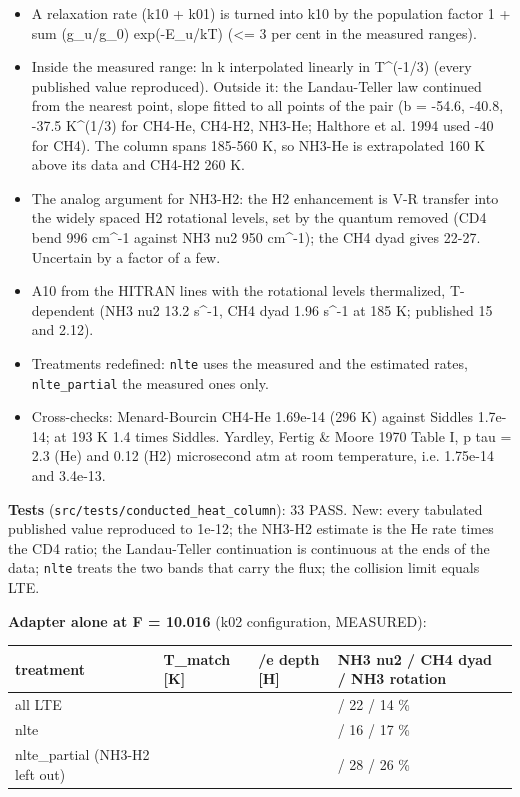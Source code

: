 \documentclass[english,a4paper]{my_memo}
\providecommand{\tightlist}{\setlength{\itemsep}{0pt}\setlength{\parskip}{0pt}}
\begin{document}
\begin{itemize}
\tightlist
\item
  A relaxation rate (k10 + k01) is turned into k10 by the population
  factor 1 + sum (g\_u/g\_0) exp(-E\_u/kT) (\textless= 3 per cent in the measured
  ranges).
\item
  Inside the measured range: ln k interpolated linearly in T\^{}(-1/3)
  (every published value reproduced). Outside it: the Landau-Teller law
  continued from the nearest point, slope fitted to all points of the pair
  (b = -54.6, -40.8, -37.5 K\^{}(1/3) for CH4-He, CH4-H2, NH3-He; Halthore et
  al. 1994 used -40 for CH4). The column spans 185-560 K, so NH3-He is
  extrapolated 160 K above its data and CH4-H2 260 K.
\item
  The analog argument for NH3-H2: the H2 enhancement is V-R transfer into
  the widely spaced H2 rotational levels, set by the quantum removed (CD4
  bend 996 cm\^{}-1 against NH3 nu2 950 cm\^{}-1); the CH4 dyad gives 22-27.
  Uncertain by a factor of a few.
\item
  A10 from the HITRAN lines with the rotational levels thermalized,
  T-dependent (NH3 nu2 13.2 s\^{}-1, CH4 dyad 1.96 s\^{}-1 at 185 K;
  published 15 and 2.12).
\item
  Treatments redefined: \texttt{nlte} uses the measured and the estimated rates,
  \texttt{nlte\_partial} the measured ones only.
\item
  Cross-checks: Menard-Bourcin CH4-He 1.69e-14 (296 K) against Siddles
  1.7e-14; at 193 K 1.4 times Siddles. Yardley, Fertig \& Moore 1970 Table I,
  p tau = 2.3 (He) and 0.12 (H2) microsecond atm at room temperature, i.e.
  1.75e-14 and 3.4e-13.
\end{itemize}

\textbf{Tests} (\texttt{src/tests/conducted\_heat\_column}): 33 PASS. New: every
tabulated published value reproduced to 1e-12; the NH3-H2 estimate is the
He rate times the CD4 ratio; the Landau-Teller continuation is continuous
at the ends of the data; \texttt{nlte} treats the two bands that carry the flux;
the collision limit equals LTE.

\textbf{Adapter alone at F = 10.016} (k02 configuration, MEASURED):

{\def\LTcaptype{none} %
{\small
\begin{longtable}[]{@{}>{\raggedright\arraybackslash}p{\dimexpr(\linewidth-8\tabcolsep)/4\relax}>{\raggedright\arraybackslash}p{\dimexpr(\linewidth-8\tabcolsep)/4\relax}>{\raggedright\arraybackslash}p{\dimexpr(\linewidth-8\tabcolsep)/4\relax}>{\raggedright\arraybackslash}p{\dimexpr(\linewidth-8\tabcolsep)/4\relax}@{}}
\toprule\noalign{}
treatment & T\_match {[}K{]} & 1/e depth {[}H{]} & NH3 nu2 / CH4 dyad / NH3 rotation \\
\midrule\noalign{}
\endhead
\bottomrule\noalign{}
\endlastfoot
all LTE & 337.50 & 0.070 & 61 / 22 / 14 \% \\
nlte & 353.24 & 0.077 & 62 / 16 / 17 \% \\
nlte\_partial (NH3-H2 left out) & 380.23 & 0.091 & 38 / 28 / 26 \% \\
\end{longtable}
}
}
\end{document}
